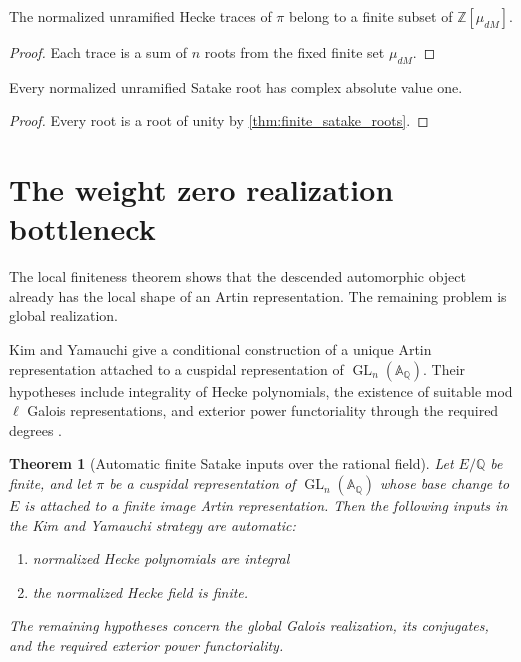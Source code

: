 \documentclass{aomart}
\newtheorem{theorem}{Theorem}[section]
\theoremstyle{definition}
\theoremstyle{remark}
\newcommand{\QQ}{\mathbb Q}
\newcommand{\ZZ}{\mathbb Z}
\newcommand{\Adele}{\mathbb A}
\newcommand{\GL}{\operatorname{GL}}
\begin{document}
\begin{corollary}\label{cor:finite_trace_alphabet}
The normalized unramified Hecke traces of \(\pi\) belong to a finite subset of \(\ZZ[\mu_{dM}]\).
\end{corollary}

\begin{proof}
Each trace is a sum of \(n\) roots from the fixed finite set \(\mu_{dM}\).
\end{proof}

\begin{corollary}\label{cor:unramified_ramanujan}
Every normalized unramified Satake root has complex absolute value one.
\end{corollary}

\begin{proof}
Every root is a root of unity by \cref{thm:finite_satake_roots}.
\end{proof}

\section{The weight zero realization bottleneck}\label{sec:realization}

The local finiteness theorem shows that the descended automorphic object already has the local shape of an Artin representation. The remaining problem is global realization.

\begin{standardfact}\label{fact:kim_yamauchi}
Kim and Yamauchi give a conditional construction of a unique Artin representation attached to a cuspidal representation of \(\GL_n(\Adele_\QQ)\). Their hypotheses include integrality of Hecke polynomials, the existence of suitable mod \(\ell\) Galois representations, and exterior power functoriality through the required degrees \cite{KimYamauchi2016}.
\end{standardfact}

\begin{theorem}[Automatic finite Satake inputs over the rational field]\label{thm:automatic_KY_inputs}
Let \(E/\QQ\) be finite, and let \(\pi\) be a cuspidal representation of \(\GL_n(\Adele_\QQ)\) whose base change to \(E\) is attached to a finite image Artin representation. Then the following inputs in the Kim and Yamauchi strategy are automatic:

\begin{enumerate}
\item normalized Hecke polynomials are integral
\item the normalized Hecke field is finite.
\end{enumerate}

The remaining hypotheses concern the global Galois realization, its conjugates, and the required exterior power functoriality.
\end{theorem}
\end{document}
